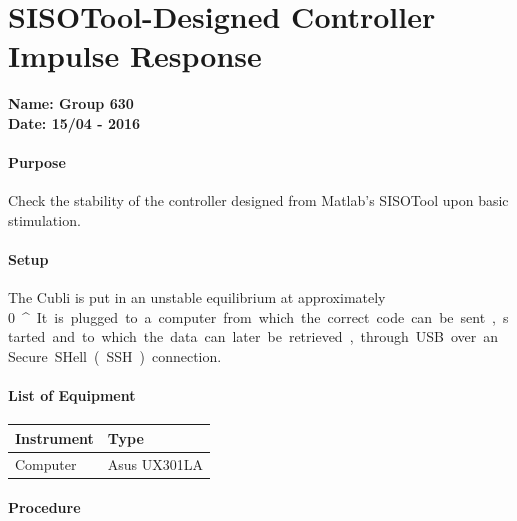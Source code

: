 \chapter{SISOTool-Designed Controller Impulse Response} \label{app:sisoToolDControllerTest}
\textbf{Name: Group 630}\\
\textbf{Date: 15/04 - 2016}

\subsubsection{Purpose}
Check the stability of the controller designed from Matlab's SISOTool upon basic stimulation.

\subsubsection{Setup}
The Cubli is put in an unstable equilibrium at approximately \SI{0}{^{\circ}}. 
It is plugged to a computer from which the correct code can be sent, started and to which the data can later be retrieved, through USB over an Secure SHell (SSH) connection.

\subsubsection{List of Equipment}
\begin{table}[H]
\begin{tabular}{|p{10cm}|p{4cm}|}
\hline%
  \textbf{Instrument}                &  \textbf{Type} \\
\hline%
  Computer                           &  Asus UX301LA  \\
\hline%
\end{tabular}
\end{table}

\subsubsection{Procedure}

